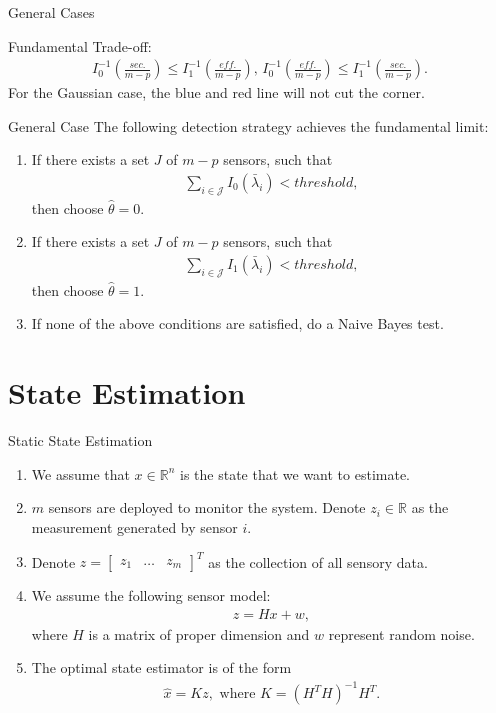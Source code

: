 \documentclass[10pt]{beamer}
\newcommand{\tikzdir}[1]{#1.tikz}
\newcommand{\inputtikz}[1]{}}
\begin{document}
\begin{frame}{General Cases}
  \begin{center}
    \inputtikz{fun_lim}
  \end{center}
  Fundamental Trade-off:
  \begin{align*}
I_0^{-1}\left(\frac{sec.}{m-p}\right)\leq I_1^{-1}\left(\frac{eff.}{m-p}\right),\, I_0^{-1}\left(\frac{eff.}{m-p}\right)\leq I_1^{-1}\left(\frac{sec.}{m-p}\right). 
  \end{align*}
  For the Gaussian case, the blue and red line will not cut the corner.
\end{frame}

\begin{frame}{General Case}
  The following detection strategy achieves the fundamental limit:
  \begin{enumerate}
  \item If there exists a set $J$ of $m-p$ sensors, such that
    \begin{align*}
      \sum_{i\in \mathcal J}I_0(\bar \lambda_i) < threshold,
    \end{align*}
    then choose $\hat \theta = 0$. 
  \item If there exists a set $J$ of $m-p$ sensors, such that
    \begin{align*}
      \sum_{i\in \mathcal J}I_1(\bar \lambda_i) < threshold,
    \end{align*}
    then choose $\hat \theta = 1$. 
  \item If none of the above conditions are satisfied, do a Naive Bayes test.
  \end{enumerate}
\end{frame}

\section{State Estimation}

\begin{frame}{Static State Estimation}
  \begin{enumerate}
  \item We assume that $x \in \mathbb R^n$ is the state that we want to estimate.
  \item $m$ sensors are deployed to monitor the system. Denote $z_i \in \mathbb R$ as the measurement generated by sensor $i$.
  \item Denote $z = \begin{bmatrix}z_1&\dots&z_m\end{bmatrix}^T$ as the collection of all sensory data.
  \item We assume the following sensor model:
    \begin{align*}
      z = Hx + w,
    \end{align*}
    where $H$ is a matrix of proper dimension and $w$ represent random noise.
  \item The optimal state estimator is of the form
    \begin{align*}
      \hat x = Kz, \text{ where }K = (H^TH)^{-1}H^T.
    \end{align*}
  \end{enumerate}
\end{frame}
\end{document}
